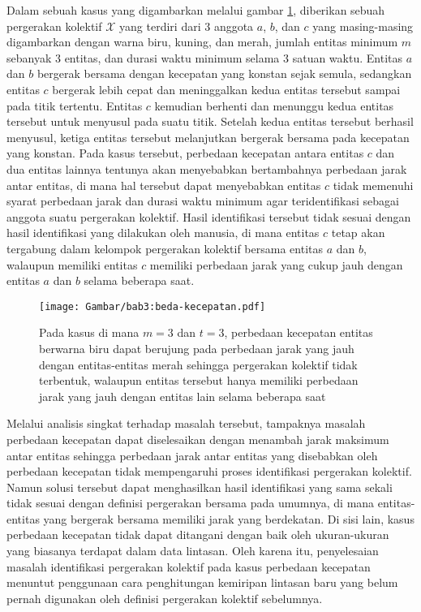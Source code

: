 Dalam sebuah kasus yang digambarkan melalui gambar \ref{bab3:masalah-kecepatan}, diberikan sebuah pergerakan kolektif $\mathcal{X}$ yang terdiri dari $3$ anggota $a$, $b$, dan $c$ yang masing-masing digambarkan dengan warna biru, kuning, dan merah, jumlah entitas minimum $m$ sebanyak $3$ entitas, dan durasi waktu minimum selama $3$ satuan waktu. Entitas $a$ dan $b$ bergerak bersama dengan kecepatan yang konstan sejak semula, sedangkan entitas $c$ bergerak lebih cepat dan meninggalkan kedua entitas tersebut sampai pada titik tertentu. Entitas $c$ kemudian berhenti dan menunggu kedua entitas tersebut untuk menyusul pada suatu titik. Setelah kedua entitas tersebut berhasil menyusul, ketiga entitas tersebut melanjutkan bergerak bersama pada kecepatan yang konstan. Pada kasus tersebut, perbedaan kecepatan antara entitas $c$ dan dua entitas lainnya tentunya akan menyebabkan bertambahnya perbedaan jarak antar entitas, di mana hal tersebut dapat menyebabkan entitas $c$ tidak memenuhi syarat perbedaan jarak dan durasi waktu minimum agar teridentifikasi sebagai anggota suatu pergerakan kolektif. Hasil identifikasi tersebut tidak sesuai dengan hasil identifikasi yang dilakukan oleh manusia, di mana entitas $c$ tetap akan tergabung dalam kelompok pergerakan kolektif bersama entitas $a$ dan $b$, walaupun memiliki entitas $c$ memiliki perbedaan jarak yang cukup jauh dengan entitas $a$ dan $b$ selama beberapa saat.

\begin{figure}[t]
    \centering
    \texttt{[image: Gambar/bab3:beda-kecepatan.pdf]}
    \caption[Masalah identifikasi pada kasus perbedaan kecepatan]{Pada kasus di mana $m = 3$ dan $t = 3$, perbedaan kecepatan entitas berwarna biru dapat berujung pada perbedaan jarak yang jauh dengan entitas-entitas merah sehingga pergerakan kolektif tidak terbentuk, walaupun entitas tersebut hanya memiliki perbedaan jarak yang jauh dengan entitas lain selama beberapa saat}
    \label{bab3:masalah-kecepatan}
\end{figure}
    
Melalui analisis singkat terhadap masalah tersebut, tampaknya masalah perbedaan kecepatan dapat diselesaikan dengan menambah jarak maksimum antar entitas sehingga perbedaan jarak antar entitas yang disebabkan oleh perbedaan kecepatan tidak mempengaruhi proses identifikasi pergerakan kolektif. Namun solusi tersebut dapat menghasilkan hasil identifikasi yang sama sekali tidak sesuai dengan definisi pergerakan bersama pada umumnya, di mana entitas-entitas yang bergerak bersama memiliki jarak yang berdekatan. Di sisi lain, kasus perbedaan kecepatan tidak dapat ditangani dengan baik oleh ukuran-ukuran yang biasanya terdapat dalam data lintasan. Oleh karena itu, penyelesaian masalah identifikasi pergerakan kolektif pada kasus perbedaan kecepatan menuntut penggunaan cara penghitungan kemiripan lintasan baru yang belum pernah digunakan oleh definisi pergerakan kolektif sebelumnya.

